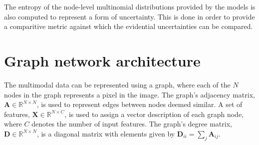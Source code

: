 \documentclass[
twocolumn,
]{ceurart}
\begin{document}
The entropy of the node-level multinomial distributions provided by the models is also computed to represent a form of uncertainty.
This is done in order to provide a comparitive metric against which the evidential uncertainties can be compared.

\section{Graph network architecture}
\label{sec::GraphNetworkArchitecture}
The multimodal data can be represented using a graph, where each of the $N$ nodes in the graph represents a pixel in the image.
The graph's adjacency matrix, $\mathbf{A}\in\mathbb{R}^{N\times N}$, is used to represent edges between nodes deemed similar.
A set of features, $\mathbf{X}\in\mathbb{R}^{N\times C}$, is used to assign a vector description of each graph node, where $C$ denotes the number of input features.
The graph's degree matrix, $\mathbf{D}\in\mathbb{R}^{N\times N}$, is a diagonal matrix with elements given by $\mathbf{D}_{ii}=\sum_j\mathbf{A}_{ij} $.
\end{document}
